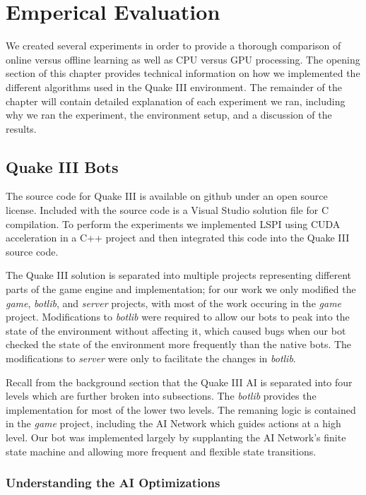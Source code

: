 \chapter{Emperical Evaluation}
\label{chap:evaluation}

We created several experiments in order to provide a thorough comparison of online versus offline learning as well as CPU versus GPU processing. The opening section of this chapter provides technical information on how we implemented the different algorithms used in the Quake III environment. The remainder of the chapter will contain detailed explanation of each experiment we ran, including why we ran the experiment, the environment setup, and a discussion of the results.

\section{Quake III Bots}

The source code for Quake III is available on github under an open source license. \cite{q3code} Included with the source code is a Visual Studio solution file for C compilation. To perform the experiments we implemented LSPI using CUDA acceleration in a C++ project and then integrated this code into the Quake III source code.

The Quake III solution is separated into multiple projects representing different parts of the game engine and implementation; for our work we only modified the \emph{game}, \emph{botlib}, and \emph{server} projects, with most of the work occuring in the \emph{game} project. Modifications to \emph{botlib} were required to allow our bots to peak into the state of the environment without affecting it, which caused bugs when our bot checked the state of the environment more frequently than the native bots. The modifications to \emph{server} were only to facilitate the changes in \emph{botlib}.

Recall from the background section that the Quake III AI is separated into four levels which are further broken into subsections. The \emph{botlib} provides the implementation for most of the lower two levels. The remaning logic is contained in the \emph{game} project, including the AI Network which guides actions at a high level. Our bot was implemented largely by supplanting the AI Network's finite state machine and allowing more frequent and flexible state transitions.

\subsection{Understanding the AI Optimizations}


